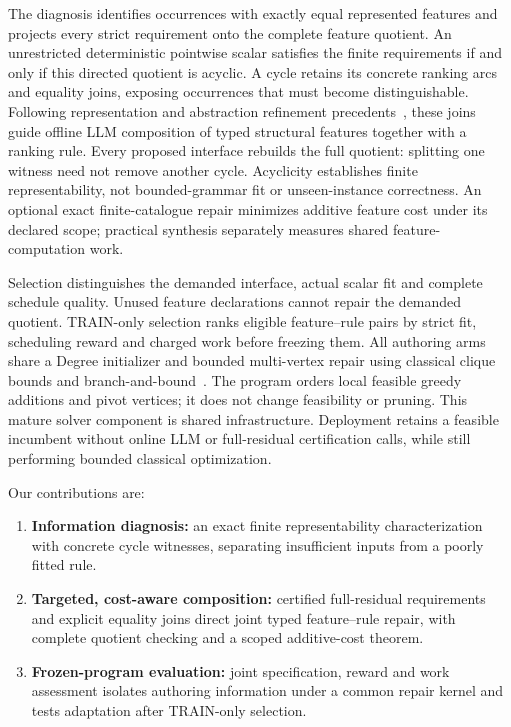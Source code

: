 The diagnosis identifies occurrences with exactly equal represented features
and projects every strict requirement onto the complete feature quotient.
An unrestricted deterministic pointwise scalar satisfies the finite requirements
if and only if this directed quotient is acyclic. A cycle retains its concrete
ranking arcs and equality joins, exposing occurrences that must become
distinguishable. Following representation and abstraction refinement
precedents~\cite{clarke2000cegar,frances2021policies}, these joins guide offline
LLM composition of typed structural features together with a ranking rule.
Every proposed interface rebuilds the full quotient: splitting one witness
need not remove another cycle. Acyclicity establishes finite representability,
not bounded-grammar fit or unseen-instance correctness. An optional exact
finite-catalogue repair minimizes additive feature cost under its declared
scope; practical synthesis separately measures shared feature-computation work.

Selection distinguishes the demanded interface, actual scalar fit and complete
schedule quality. Unused feature declarations cannot repair the demanded
quotient. TRAIN-only selection ranks eligible feature--rule pairs by strict
fit, scheduling reward and charged work before freezing them. All authoring
arms share a Degree initializer and bounded multi-vertex repair using classical
clique bounds and branch-and-bound~\cite{lamm2019weighted,grossmann2025chils}.
The program orders local feasible greedy additions and pivot vertices; it
does not change feasibility or pruning. This mature solver component is
shared infrastructure. Deployment retains a feasible incumbent without online
LLM or full-residual certification calls, while still performing bounded
classical optimization.

Our contributions are:
\begin{enumerate}
\item \textbf{Information diagnosis:} an exact finite representability
characterization with concrete cycle witnesses, separating insufficient
inputs from a poorly fitted rule.
\item \textbf{Targeted, cost-aware composition:} certified full-residual
requirements and explicit equality joins direct joint typed feature--rule
repair, with complete quotient checking and a scoped additive-cost theorem.
\item \textbf{Frozen-program evaluation:} joint specification, reward and
work assessment isolates authoring information under a common repair kernel
and tests adaptation after TRAIN-only selection.
\end{enumerate}

